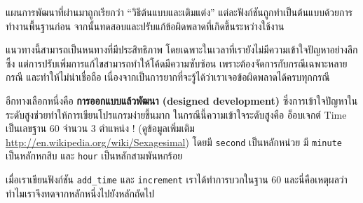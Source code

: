 
แผนการพัฒนาที่ผ่านมาถูกเรียกว่า ``วิธีต้นแบบและเติมแต่ง'' แต่ละฟังก์ชันถูกทำเป็นต้นแบบด้วยการทำงานพื้นฐานก่อน จากนั้นทดสอบและปรับแก้ข้อผิดพลาดที่เกิดขึ้นระหว่างใช้งาน


แนวทางนี้สามารถเป็นหนทางที่มีประสิทธิภาพ โดยเฉพาะในเวลาที่เรายังไม่มีความเข้าใจปัญหาอย่างลึกซึ้ง 
แต่การปรับเพิ่มการแก้ไขสามารถทำให้โค้ดมีความซับซ้อน เพราะต้องจัดการกับกรณีเฉพาะหลายกรณี และทำให้ไม่น่าเชื่อถือ 
เนื่องจากเป็นการยากที่จะรู้ได้ว่าเราเจอข้อผิดพลาดได้ครบทุกกรณี



อีกทางเลือกหนึ่งคือ {\bf การออกแบบแล้วพัฒนา (designed development)} ซึ่งการเข้าใจปัญหาในระดับสูงช่วยทำให้การเขียนโปรแกรมง่ายขึ้นมาก 
ในกรณีนี้ความเข้าใจระดับสูงคือ อ็อบเจกต์ Time เป็นเลขฐาน 60 จำนวน 3 ตำแหน่ง !
(ดูข้อมูลเพิ่มเติม \url{http://en.wikipedia.org/wiki/Sexagesimal}) 
โดยมี {\tt second} เป็นหลักหน่วย มี {\tt minute} เป็นหลักหกสิบ 
และ {\tt hour} เป็นหลักสามพันหกร้อย


เมื่อเราเขียนฟังก์ชัน \verb"add_time" และ {\tt increment} เราได้ทำการบวกในฐาน 60 
และนี่คือเหตุผลว่าทำไมเราจึงทดจากหลักหนึ่งไปยังหลักถัดไป



